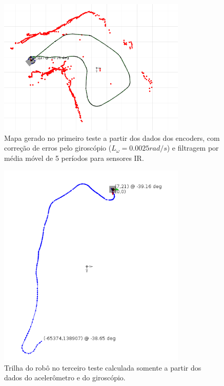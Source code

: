 \begin{figure}[H]
	\centering
	\includegraphics[width=0.8\textwidth]{./figuras/testes/teste3/mapa_encoders_giro_media5.png}
	\caption{Mapa gerado no primeiro teste a partir dos dados dos encoders, com correção de erros pelo giroscópio ($L_\omega = 0.0025 \unit{rad/s}$) e filtragem por média móvel de 5 períodos para sensores IR.}
	\label{fig:teste3_mapa_encoders_giro_media5}
\end{figure}

\begin{figure}[H]
	\centering
	\includegraphics[width=0.8\textwidth]{./figuras/testes/teste3/mapa_acelerometro.png}
	\caption{Trilha do robô no terceiro teste calculada somente a partir dos dados do acelerômetro e do giroscópio.}
	\label{fig:teste3_mapa_acelerometro}
\end{figure}

